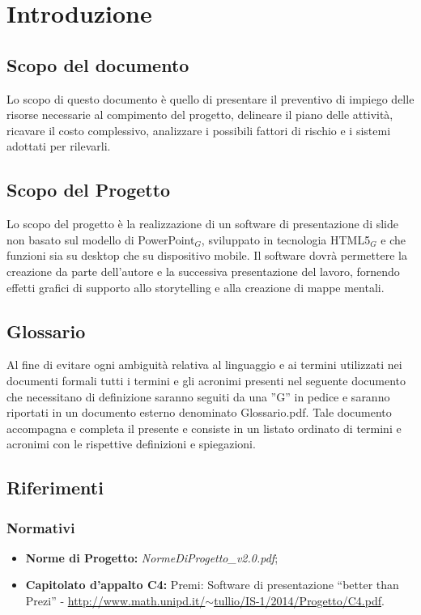 \section{Introduzione}

\subsection{Scopo del documento}
Lo scopo di questo documento è quello di presentare il preventivo di impiego delle risorse necessarie al compimento del progetto, delineare il piano delle attività, ricavare il costo complessivo, analizzare i possibili fattori di rischio e i sistemi adottati per rilevarli.

\subsection{Scopo del Progetto}
Lo scopo del progetto è la realizzazione di un software di presentazione di slide non basato sul modello di PowerPoint$_{G}$, sviluppato in tecnologia HTML5$_{G}$ e che funzioni sia su desktop che su dispositivo mobile. Il software dovrà permettere la creazione da parte dell'autore e la successiva presentazione del lavoro, fornendo effetti grafici di supporto allo storytelling e alla creazione di mappe mentali. 

\subsection{Glossario}
Al fine di evitare ogni ambiguità relativa al linguaggio e ai termini utilizzati nei documenti formali tutti i termini e gli acronimi presenti nel seguente documento che necessitano di definizione saranno seguiti da una ”G” in pedice e saranno riportati in un documento esterno denominato Glossario.pdf. Tale documento accompagna e completa il presente e consiste in un listato ordinato di termini e acronimi con le rispettive definizioni e spiegazioni.

\subsection{Riferimenti}
\subsubsection{Normativi}
\begin{itemize}
	\item \textbf{Norme di Progetto:} \textit{NormeDiProgetto\_v2.0.pdf};
	\item \textbf{Capitolato d'appalto C4:} Premi: Software di presentazione ``better than Prezi'' - \href{http://www.math.unipd.it/~tullio/IS-1/2014/Progetto/C4.pdf}{http://www.math.unipd.it/$\sim$tullio/IS-1/2014/Progetto/C4.pdf}.
\end{itemize}
